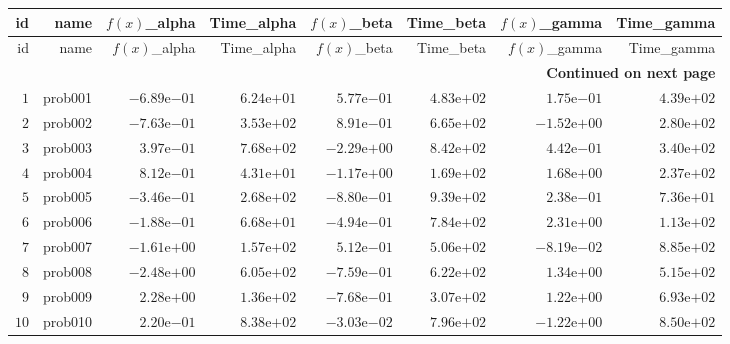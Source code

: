 \documentclass[varwidth=20cm,crop=true]{standalone}
\begin{document}
\begin{longtable}{rrrrrrrr}
  \hline
  id & name & \(f(x)\)\_alpha & Time\_alpha & \(f(x)\)\_beta & Time\_beta & \(f(x)\)\_gamma & Time\_gamma \\\hline
  \endfirsthead
  \hline
  id & name & \(f(x)\)\_alpha & Time\_alpha & \(f(x)\)\_beta & Time\_beta & \(f(x)\)\_gamma & Time\_gamma \\\hline
  \endhead
  \hline
  \multicolumn{8}{r}{{\bfseries Continued on next page}}\\
  \hline
  \endfoot
  \endlastfoot
  \(     1\) & prob001 & \(-6.89\)e\(-01\) & \( 6.24\)e\(+01\) & \( 5.77\)e\(-01\) & \( 4.83\)e\(+02\) & \( 1.75\)e\(-01\) & \( 4.39\)e\(+02\) \\
  \(     2\) & prob002 & \(-7.63\)e\(-01\) & \( 3.53\)e\(+02\) & \( 8.91\)e\(-01\) & \( 6.65\)e\(+02\) & \(-1.52\)e\(+00\) & \( 2.80\)e\(+02\) \\
  \(     3\) & prob003 & \( 3.97\)e\(-01\) & \( 7.68\)e\(+02\) & \(-2.29\)e\(+00\) & \( 8.42\)e\(+02\) & \( 4.42\)e\(-01\) & \( 3.40\)e\(+02\) \\
  \(     4\) & prob004 & \( 8.12\)e\(-01\) & \( 4.31\)e\(+01\) & \(-1.17\)e\(+00\) & \( 1.69\)e\(+02\) & \( 1.68\)e\(+00\) & \( 2.37\)e\(+02\) \\
  \(     5\) & prob005 & \(-3.46\)e\(-01\) & \( 2.68\)e\(+02\) & \(-8.80\)e\(-01\) & \( 9.39\)e\(+02\) & \( 2.38\)e\(-01\) & \( 7.36\)e\(+01\) \\
  \(     6\) & prob006 & \(-1.88\)e\(-01\) & \( 6.68\)e\(+01\) & \(-4.94\)e\(-01\) & \( 7.84\)e\(+02\) & \( 2.31\)e\(+00\) & \( 1.13\)e\(+02\) \\
  \(     7\) & prob007 & \(-1.61\)e\(+00\) & \( 1.57\)e\(+02\) & \( 5.12\)e\(-01\) & \( 5.06\)e\(+02\) & \(-8.19\)e\(-02\) & \( 8.85\)e\(+02\) \\
  \(     8\) & prob008 & \(-2.48\)e\(+00\) & \( 6.05\)e\(+02\) & \(-7.59\)e\(-01\) & \( 6.22\)e\(+02\) & \( 1.34\)e\(+00\) & \( 5.15\)e\(+02\) \\
  \(     9\) & prob009 & \( 2.28\)e\(+00\) & \( 1.36\)e\(+02\) & \(-7.68\)e\(-01\) & \( 3.07\)e\(+02\) & \( 1.22\)e\(+00\) & \( 6.93\)e\(+02\) \\
  \(    10\) & prob010 & \( 2.20\)e\(-01\) & \( 8.38\)e\(+02\) & \(-3.03\)e\(-02\) & \( 7.96\)e\(+02\) & \(-1.22\)e\(+00\) & \( 8.50\)e\(+02\) \\\hline
\end{longtable}
\end{document}
